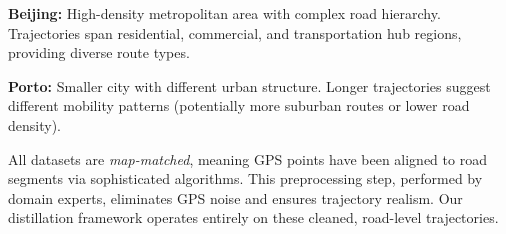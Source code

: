 \textbf{Beijing:} High-density metropolitan area with complex road hierarchy. Trajectories span residential, commercial, and transportation hub regions, providing diverse route types.

\textbf{Porto:} Smaller city with different urban structure. Longer trajectories suggest different mobility patterns (potentially more suburban routes or lower road density).

All datasets are \emph{map-matched}, meaning GPS points have been aligned to road segments via sophisticated algorithms. This preprocessing step, performed by domain experts, eliminates GPS noise and ensures trajectory realism. Our distillation framework operates entirely on these cleaned, road-level trajectories.

